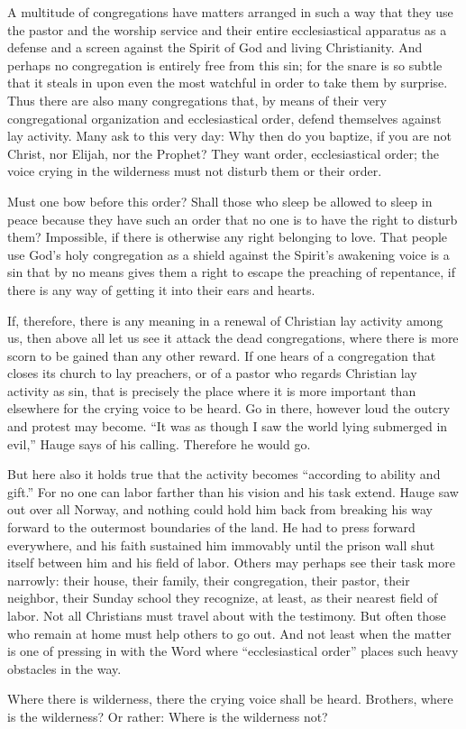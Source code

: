 A multitude of congregations have matters arranged in such a way that they use the pastor and the worship service and their entire ecclesiastical apparatus as a defense and a screen against the Spirit of God and living Christianity. And perhaps no congregation is entirely free from this sin; for the snare is so subtle that it steals in upon even the most watchful in order to take them by surprise. Thus there are also many congregations that, by means of their very congregational organization and ecclesiastical order, defend themselves against lay activity. Many ask to this very day: Why then do you baptize, if you are not Christ, nor Elijah, nor the Prophet? They want order, ecclesiastical order; the voice crying in the wilderness must not disturb them or their order.

Must one bow before this order? Shall those who sleep be allowed to sleep in peace because they have such an order that no one is to have the right to disturb them? Impossible, if there is otherwise any right belonging to love. That people use God’s holy congregation as a shield against the Spirit’s awakening voice is a sin that by no means gives them a right to escape the preaching of repentance, if there is any way of getting it into their ears and hearts.

If, therefore, there is any meaning in a renewal of Christian lay activity among us, then above all let us see it attack the dead congregations, where there is more scorn to be gained than any other reward. If one hears of a congregation that closes its church to lay preachers, or of a pastor who regards Christian lay activity as sin, that is precisely the place where it is more important than elsewhere for the crying voice to be heard. Go in there, however loud the outcry and protest may become. “It was as though I saw the world lying submerged in evil,” Hauge says of his calling. Therefore he would go.

But here also it holds true that the activity becomes “according to ability and gift.” For no one can labor farther than his vision and his task extend. Hauge saw out over all Norway, and nothing could hold him back from breaking his way forward to the outermost boundaries of the land. He had to press forward everywhere, and his faith sustained him immovably until the prison wall shut itself between him and his field of labor. Others may perhaps see their task more narrowly: their house, their family, their congregation, their pastor, their neighbor, their Sunday school they recognize, at least, as their nearest field of labor. Not all Christians must travel about with the testimony. But often those who remain at home must help others to go out. And not least when the matter is one of pressing in with the Word where “ecclesiastical order” places such heavy obstacles in the way.

Where there is wilderness, there the crying voice shall be heard. Brothers, where is the wilderness? Or rather: Where is the wilderness not? 
